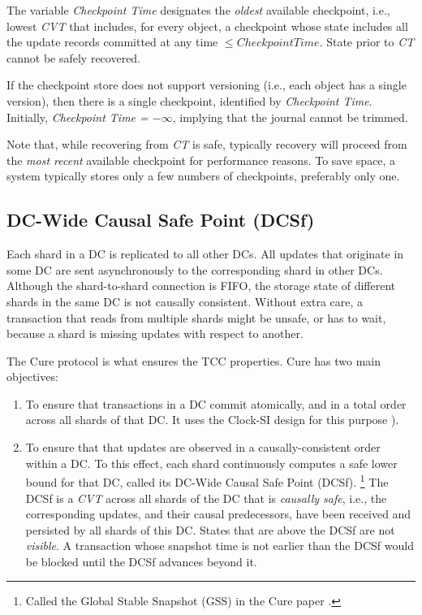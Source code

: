 \documentclass[twoside]{article}
\begin{document}
The variable \emph{Checkpoint Time} designates the \emph{oldest} available
checkpoint, i.e., lowest \emph{CVT} that includes, for every object, a
checkpoint whose state includes all the update records committed at any time
$\le \mathit{Checkpoint Time}$.
State prior to \emph{CT} cannot be safely recovered.

If the checkpoint store does not support versioning (i.e., each object
has a single version), then there is a single checkpoint, identified by
\emph{Checkpoint Time}.
Initially, \emph{Checkpoint Time = $-\infty$}, implying that the journal
cannot be trimmed.

Note that, while recovering from \emph{CT} is safe, typically recovery will
proceed from the \emph{most recent} available checkpoint for performance
reasons.
To save space, a system typically stores only a few numbers of checkpoints,
preferably only one. 


\subsection{DC-Wide Causal Safe Point (DCSf)}
\label{sec:dcsf}
Each shard in a DC is replicated to all other DCs.
All updates that originate in some DC are sent asynchronously to the
corresponding shard in other DCs.
Although the shard-to-shard connection is FIFO, the storage state of
different shards in the same DC is not causally consistent.
Without extra care, a transaction that reads from multiple shards might
be unsafe, or has to wait, because a shard is missing updates with
respect to another.

The Cure protocol \cite{rep:pro:sh182} is what ensures the TCC properties.
Cure has two main objectives:
\begin{enumerate}%
\item To ensure that transactions in a DC commit atomically, and in a
  total order across all shards of that DC\@.
  It uses the Clock-SI design for this purpose
  \cite{rep:pan:1723}).
\item To ensure that that updates are observed in a causally-consistent
  order within a DC\@.
  To this effect, each shard continuously computes a safe lower bound
  for that DC, called its DC-Wide Causal Safe Point (DCSf).%
\footnote{
  Called the Global Stable Snapshot (GSS) in the Cure paper
  \cite{rep:pro:sh182}.
}
  The DCSf is a \emph{CVT} across all shards of the DC that is
  \emph{causally safe}, i.e., the corresponding updates, and their causal
  predecessors, have been received and persisted by all shards of this DC.
  States that are above the DCSf are not \emph{visible}.
  A transaction whose snapshot time is not earlier than the DCSf would
  be blocked until the DCSf advances beyond it.
\end{enumerate}
\end{document}
